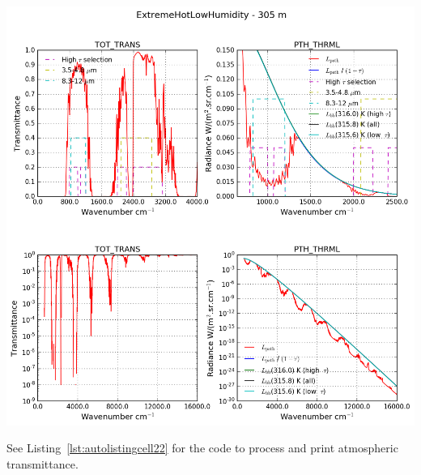 \documentclass{workpackage}
\begin{document}
\begin{center}
\includegraphics{./pic/Analyse-Standard-Atmospheres_21_1.png}
\end{center}



See Listing~\ref{lst:autolistingcell22} for the code to process and print atmospheric transmittance.
\end{document}
